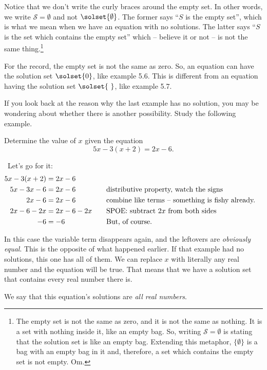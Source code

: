 Notice that we don't write the curly braces around the empty set. In other words, we write $\mathcal{S}=\emptyset$ and not $\solset{\emptyset}$. The former says ``$S$ is the empty set'', which is what we mean when we have an equation with no solutions. The latter says ``$S$ is the set which contains the empty set'' which -- believe it or not -- is not the same thing.\footnote{The empty set is not the same as zero, and it is not the same as nothing. It is a set with nothing inside it, like an empty bag. So, writing $\mathcal{S} = \emptyset$ is stating that the solution set is like an empty bag. Extending this metaphor, $\{\emptyset\}$ is a bag with an empty bag in it and, therefore, a set which contains the empty set is not empty. Om.}

For the record, the empty set is not the same as zero. So, an equation can have the solution set $\solset{0}$, like example 5.6. This is different from an equation having the solution set $\solset{~}$, like example 5.7.

If you look back at the reason why the last example has no solution, you may be wondering about whether there is another possibility. Study the following example.

\begin{boxedex}
Determine the value of $x$ given the equation \[5x-3(x+2)=2x-6.\]

\exsoln\ Let's go for it:
\[\begin{aligned}
5x-3(x+2) &= 2x-6\\
5x-3x-6 &= 2x-6
&&\text{\quad distributive property, watch the signs}\\
2x-6 &= 2x-6
&&\text{\quad combine like terms -- something is fishy already.}\\
2x-6-2x &= 2x-6-2x
&&\text{\quad SPOE: subtract $2x$ from both sides}\\
-6 &= -6
&&\text{\quad But, of course.}\\
\end{aligned}\]

In this case the variable term disappears again, and the leftovers are \textit{obviously equal}. This is the opposite of what happened earlier. If that example had no solutions, this one has all of them. We can replace $x$ with literally any real number and the equation will be true. That means that we have a solution set that contains every real number there is.

We say that this equation's solutions are \textit{all real numbers}.
\end{boxedex}

